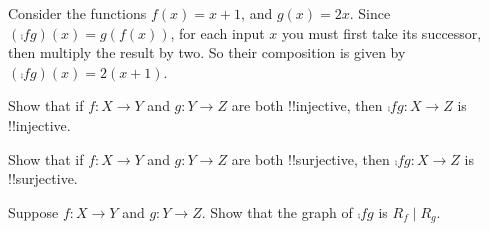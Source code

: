 \documentclass[../../../include/open-logic-section]{subfiles}
\begin{document}
\begin{ex}
Consider the functions $f(x) = x + 1$, and $g(x) = 2x$. Since $(\comp{f}{g})(x) = g(f(x))$, for each input $x$ you must first take its successor, then multiply the result by two. So their composition
is given by $(\comp{f}{g})(x) = 2(x+1)$.
\end{ex}

\begin{prob}
Show that if $f \colon X \to Y$ and $g \colon Y \to Z$ are both
!!{injective}, then $\comp{f}{g}\colon X \to Z$ is !!{injective}.
\end{prob}

\begin{prob}
Show that if $f \colon X \to Y$ and $g \colon Y \to Z$ are both
!!{surjective}, then $\comp{f}{g}\colon X \to Z$ is !!{surjective}.
\end{prob}

\begin{prob}
	Suppose $f \colon X \to Y$ and $g \colon Y \to Z$. Show that the graph
	of $\comp{f}{g}$ is $R_f \mid R_g$.
\end{prob}
\end{document}
